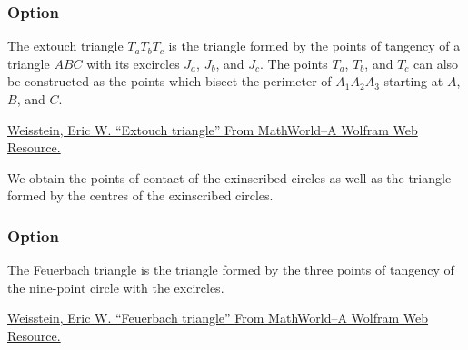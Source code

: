\subsubsection{Option }

The extouch triangle  $T_aT_bT_c$ is the triangle formed by the points of
tangency of a triangle $ABC$ with its excircles $J_a$, $J_b$, and $J_c$. The
points  $T_a$, $T_b$, and $T_c$ can also be constructed as the points which
bisect the perimeter of $A_1A_2A_3$ starting at $A$, $B$, and $C$.\par
\href{https://mathworld.wolfram.com/ExtouchTriangle.html}{Weisstein, Eric W.
\enquote{Extouch triangle} From MathWorld--A Wolfram Web Resource.}

We obtain the points of contact of the exinscribed circles as well as the
triangle formed by the centres of the exinscribed circles.

\begin{tkzexample}[latex=8cm,small]
\end{tkzexample}

\newpage

\subsubsection{Option }

The Feuerbach triangle is the triangle formed by the three points of tangency of
the nine-point circle with the excircles.\par
\href{https://mathworld.wolfram.com/FeuerbachTriangle.html}{Weisstein, Eric W.
\enquote{Feuerbach triangle} From MathWorld--A Wolfram Web Resource.}


